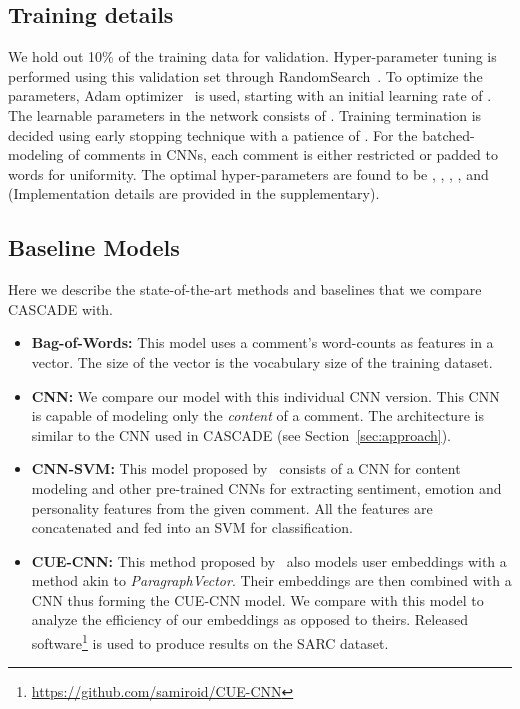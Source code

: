 \documentclass[11pt]{article}
\begin{document}
{\subsection{Training details} \label{sec:training}
We hold out 10\% of the training data for validation. Hyper-parameter tuning is performed using this validation set through RandomSearch~\cite{bergstra2012random}. To optimize the parameters, Adam optimizer~\cite{kingma2014adam} is used, starting with an initial learning rate of . The learnable parameters in the network consists of . Training termination is decided using early stopping technique with a patience of . For the batched-modeling of comments in CNNs, each comment is either restricted or padded to  words for uniformity. The optimal hyper-parameters are found to be , , , , and  (Implementation details are provided in the supplementary).







\subsection{Baseline Models} \label{sec:baselines}
Here we describe the state-of-the-art methods and baselines that we compare CASCADE with. 
\begin{itemize}[leftmargin=*,noitemsep]
	\item \textbf{Bag-of-Words:} This model uses a comment's word-counts as features in a vector. The size of the vector is the vocabulary size of the training dataset.
	\item \textbf{CNN:} We compare our model with this individual CNN version. This CNN is capable of modeling only the \textit{content} of a comment. The architecture is similar to the CNN used in CASCADE (see Section~\ref{sec:approach}).
    \item \textbf{CNN-SVM:} This model proposed by~ consists of a CNN for content modeling and other pre-trained CNNs for extracting sentiment, emotion and personality features from the given comment. All the features are concatenated and fed into an SVM for classification. 
     \item \textbf{CUE-CNN:} This method proposed by~ also models user embeddings with a method akin to \textit{ParagraphVector}. Their embeddings are then combined with a CNN thus forming the CUE-CNN model. We compare with this model to analyze the efficiency of our embeddings as opposed to theirs. Released software\footnote{\protect\url{https://github.com/samiroid/CUE-CNN}} is used to produce results on the SARC dataset.
\end{itemize}

}
\end{document}
